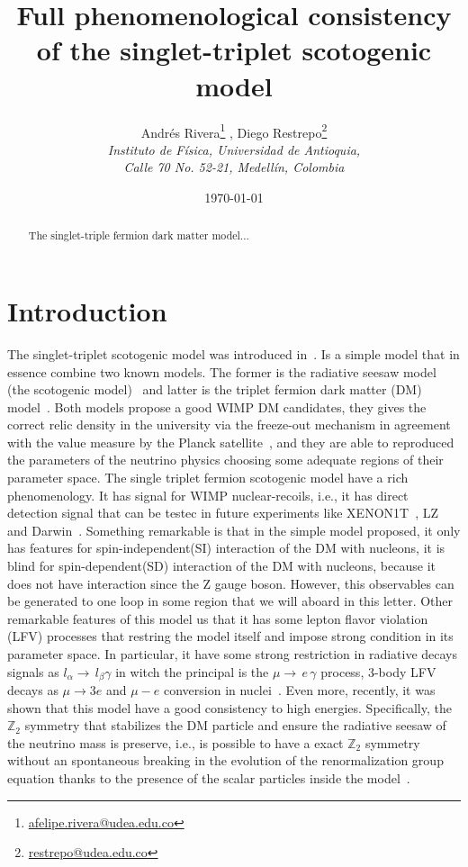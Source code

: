 \documentclass[12pt,letterpaper]{article}
\title{
Full phenomenological consistency of the singlet-triplet scotogenic model
}
\author{ 
    Andrés Rivera\footnote{\href{mailto:afelipe.rivera@udea.edu.co}{afelipe.rivera@udea.edu.co}}
   , Diego Restrepo\footnote{\href{mailto:restrepo@udea.edu.co}{restrepo@udea.edu.co}}
    \\
\textit{\small  Instituto de F\'{i}sica, Universidad de Antioquia,} \\
\textit{\small  Calle 70 No. 52-21, Medell\'{i}n, Colombia}
}
\date{\small \today}
\begin{document}
\maketitle
\begin{abstract}
The singlet-triple fermion dark matter model...

\end{abstract}



\section{Introduction}



The singlet-triplet scotogenic model was introduced in~\cite{Hirsch:2013ola}.
Is a simple model that in essence combine two known models. The former is the radiative seesaw model (the scotogenic model)~\cite{Ma:2006km} and latter is the triplet fermion dark matter (DM) model~\cite{Ma:2008cu}. Both models propose a good WIMP DM candidates, they gives the correct relic density in the university via the freeze-out mechanism in agreement with the value measure by the Planck satellite~\cite{Aghanim:2018eyx}, and they are able to reproduced the parameters of the neutrino physics choosing some adequate regions of their parameter space. 
The single triplet fermion scotogenic model have a rich phenomenology. 
It has signal for WIMP nuclear-recoils, i.e., it has direct detection signal that can be testec in future experiments like XENON1T~\cite{Aprile:2018dbl}, LZ~\cite{Mount:2017qzi} and Darwin~\cite{Aalbers:2016jon}. Something remarkable is that in the simple model proposed, it only has features for spin-independent(SI) interaction of the DM with nucleons, it is blind for spin-dependent(SD) interaction of the DM with nucleons, because it does not have interaction since the Z gauge boson. However, this observables can be generated to one loop in some region that we will aboard in this letter.
%
Other remarkable features of this model us that it has some lepton flavor violation (LFV) processes that restring the model itself and impose strong condition in its parameter space. In particular, it have some strong restriction in radiative decays signals as $l_{\alpha}\to\,l_{\beta}\gamma$ in witch the principal is the $\mu\to\,e\,\gamma$ process, 3-body LFV decays as $\mu\to 3 e$ and $\mu - e$ conversion in nuclei~\cite{Rocha-Moran:2016enp}.  
%
Even more, recently, it was shown that this model have a good consistency to high energies. Specifically, the $\mathbb{Z}_2$ symmetry that stabilizes the DM particle and ensure the radiative seesaw of the neutrino mass is preserve, i.e., is possible to have a exact $\mathbb{Z}_2$ symmetry without an spontaneous breaking in the evolution of the renormalization group equation thanks to the presence of the scalar particles inside the model~\cite{Merle:2016scw}.
\end{document}
